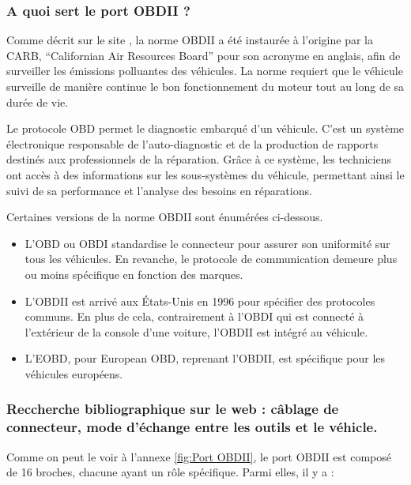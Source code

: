 \documentclass{rapportECC}
\begin{document}
\subsubsection*{A quoi sert le port OBDII ?}

Comme décrit sur le site \cite{klavkarr}, la norme OBDII a été instaurée à l'origine par la CARB, ``Californian Air Resources Board'' pour son acronyme en anglais, afin de surveiller les émissions polluantes des véhicules. La norme requiert que le véhicule surveille de manière continue le bon fonctionnement du moteur tout au long de sa durée de vie.\pagebreak

Le protocole OBD permet le diagnostic embarqué d'un véhicule. C'est un système électronique responsable de l'auto-diagnostic et de la production de rapports destinés aux professionnels de la réparation. Grâce à ce système, les techniciens ont accès à des informations sur les sous-systèmes du véhicule, permettant ainsi le suivi de sa performance et l'analyse des besoins en réparations.

Certaines versions de la norme OBDII sont énumérées ci-dessous.
\begin{itemize}
    \item L'OBD ou OBDI standardise le connecteur pour assurer son uniformité sur tous les véhicules. En revanche, le protocole de communication demeure plus ou moins spécifique en fonction des marques.
    \item L'OBDII est arrivé aux États-Unis en 1996 pour spécifier des protocoles communs. En plus de cela, contrairement à l'OBDI qui est connecté à l'extérieur de la console d'une voiture, l'OBDII est intégré au véhicule.
    \item L'EOBD, pour European OBD, reprenant l'OBDII, est spécifique pour les véhicules européens.
\end{itemize}

    
\subsubsection*{Reccherche bibliographique sur le web : câblage de connecteur, mode d'échange entre les outils et le véhicle.}

Comme on peut le voir à l'annexe \ref{fig:Port OBDII}, le port OBDII est composé de 16 broches, chacune ayant un rôle spécifique. Parmi elles, il y a :
\end{document}
